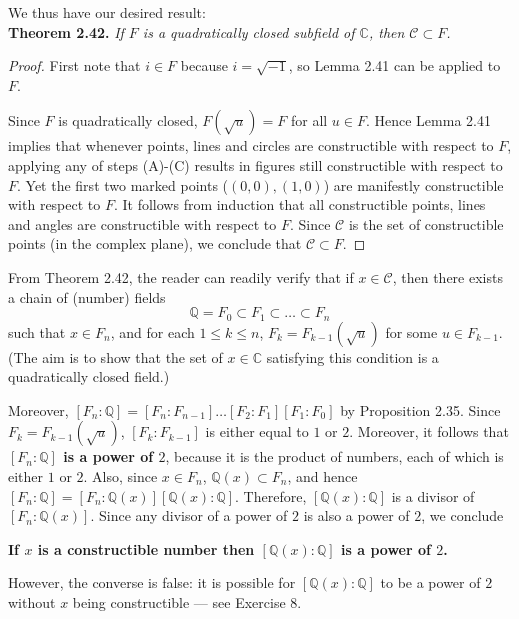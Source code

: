 \documentclass[leqno]{book}
\begin{document}
\noindent We thus have our desired result:\\

\noindent\textbf{Theorem 2.42.} \emph{If $F$ is a quadratically closed subfield of $\mathbb C$, then $\mathscr C\subset F$.}
\begin{proof}
First note that $i\in F$ because $i=\sqrt{-1}$, so Lemma 2.41 can be applied to $F$.

Since $F$ is quadratically closed, $F(\sqrt u)=F$ for all $u\in F$.  Hence Lemma 2.41 implies that whenever points, lines and circles are constructible with respect to $F$, applying any of steps (A)-(C) results in figures still constructible with respect to $F$.  Yet the first two marked points ($(0,0),(1,0)$) are manifestly constructible with respect to $F$.  It follows from induction that all constructible points, lines and angles are constructible with respect to $F$.  Since $\mathscr C$ is the set of constructible points (in the complex plane), we conclude that $\mathscr C\subset F$.
\end{proof}

\noindent From Theorem 2.42, the reader can readily verify that if $x\in\mathscr C$, then there exists a chain of (number) fields
$$\mathbb Q=F_0\subset F_1\subset\dots\subset F_n$$
such that $x\in F_n$, and for each $1\leqslant k\leqslant n$, $F_k=F_{k-1}(\sqrt u)$ for some $u\in F_{k-1}$.  (The aim is to show that the set of $x\in\mathbb C$ satisfying this condition is a quadratically closed field.)

Moreover, $[F_n:\mathbb Q]=[F_n:F_{n-1}]\dots[F_2:F_1][F_1:F_0]$ by Proposition 2.35.  Since $F_k=F_{k-1}(\sqrt u)$, $[F_k:F_{k-1}]$ is either equal to $1$ or $2$.  Moreover, it follows that \textbf{$[F_n:\mathbb Q]$ is a power of $2$}, because it is the product of numbers, each of which is either $1$ or $2$.  Also, since $x\in F_n$, $\mathbb Q(x)\subset F_n$, and hence $[F_n:\mathbb Q]=[F_n:\mathbb Q(x)][\mathbb Q(x):\mathbb Q]$.  Therefore, $[\mathbb Q(x):\mathbb Q]$ is a divisor of $[F_n:\mathbb Q(x)]$.  Since any divisor of a power of $2$ is also a power of $2$, we conclude
\begin{center}
\textbf{If $x$ is a constructible number then $[\mathbb Q(x):\mathbb Q]$ is a power of $2$.} %
\end{center}
However, the converse is false: it is possible for $[\mathbb Q(x):\mathbb Q]$ to be a power of $2$ without $x$ being constructible \---- see Exercise 8.\\
\end{document}
